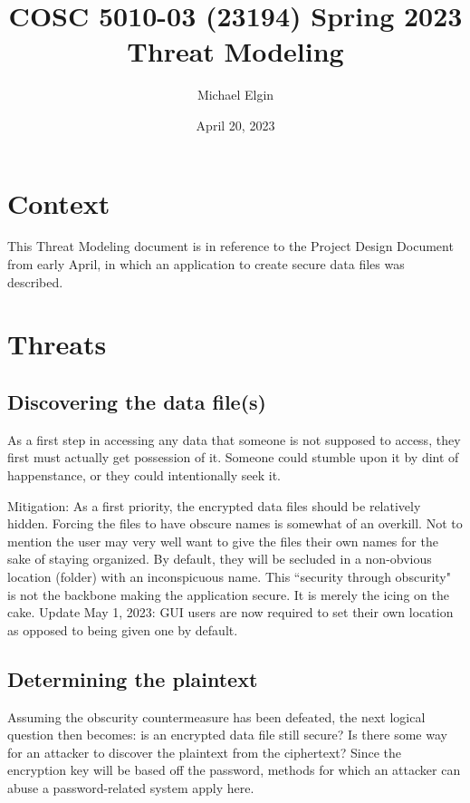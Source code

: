 \documentclass[12pt, letterpaper]{article}
\title{COSC 5010-03 (23194) Spring 2023 Threat Modeling}
\author{Michael Elgin}
\date{April 20, 2023}
\begin{document}
\maketitle

\section{Context}

This Threat Modeling document is in reference to the Project Design Document from early April, in which an application to create secure data files was described.

\section{Threats}

\subsection{Discovering the data file(s)}

As a first step in accessing any data that someone is not supposed to access, they first must actually get possession of it. Someone could stumble upon it by dint of happenstance, or they could intentionally seek it.

Mitigation: As a first priority, the encrypted data files should be relatively hidden. Forcing the files to have obscure names is somewhat of an overkill. Not to mention the user may very well want to give the files their own names for the sake of staying organized. By default, they will be secluded in a non-obvious location (folder) with an inconspicuous name. This ``security through obscurity" is not the backbone making the application secure. It is merely the icing on the cake.
\newline
\newline
Update May 1, 2023: GUI users are now required to set their own location as opposed to being given one by default.

\subsection{Determining the plaintext}

Assuming the obscurity countermeasure has been defeated, the next logical question then becomes: is an encrypted data file still secure? Is there some way for an attacker to discover the plaintext from the ciphertext? Since the encryption key will be based off the password, methods for which an attacker can abuse a password-related system apply here.
\end{document}
